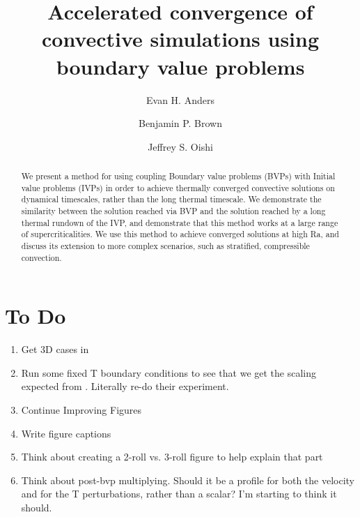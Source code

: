 \documentclass[aps, pre, onecolumn, nofootinbib, notitlepage, groupedaddress, amsfonts, amssymb, amsmath, longbibliography]{revtex4-1}
\begin{document}
\author{Evan H. Anders}
\author{Benjamin P. Brown}
\author{Jeffrey S. Oishi}
\title{Accelerated convergence of convective simulations using boundary value problems}

\begin{abstract}
We present a method for using coupling Boundary value problems (BVPs) with Initial value problems (IVPs)
in order to achieve thermally converged convective solutions on dynamical timescales, rather than the
long thermal timescale.  We demonstrate the similarity between the solution reached via BVP and the
solution reached by a long thermal rundown of the IVP, and demonstrate that this method works at a
large range of supercriticalities.  We use this method to achieve converged solutions at high Ra,
and discuss its extension to more complex scenarios, such as stratified, compressible convection.
\end{abstract}
\maketitle

\section{To Do}
\begin{enumerate}
\item Get 3D cases in
\item Run some fixed T boundary conditions to see that we get the scaling expected from 
\cite{johnston&doering2009}.  Literally re-do their experiment.
\item Continue Improving Figures
\item Write figure captions
\item Think about creating a 2-roll vs. 3-roll figure to help explain that part
\item Think about post-bvp multiplying.  Should it be a profile for both the velocity
and for the T perturbations, rather than a scalar?  I'm starting to think it should.
\end{enumerate}
\end{document}

